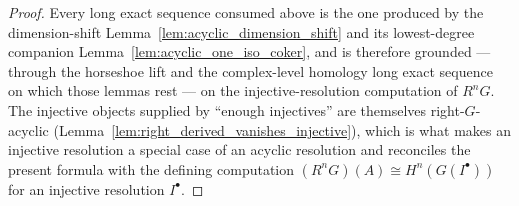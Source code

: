 \begin{proof}
  Every long exact sequence consumed above is the one produced by the dimension-shift
  Lemma~\ref{lem:acyclic_dimension_shift} and its lowest-degree companion
  Lemma~\ref{lem:acyclic_one_iso_coker}, and is therefore grounded --- through the
  horseshoe lift and the complex-level homology long exact sequence on which those
  lemmas rest --- on the injective-resolution computation of \(R^n G\). The injective
  objects supplied by ``enough injectives'' are themselves right-\(G\)-acyclic
  (Lemma~\ref{lem:right_derived_vanishes_injective}), which is what makes an injective
  resolution a special case of an acyclic resolution and reconciles the present
  formula with the defining computation \((R^n G)(A) \cong H^n(G(I^\bullet))\) for an
  injective resolution \(I^\bullet\).
\end{proof}
